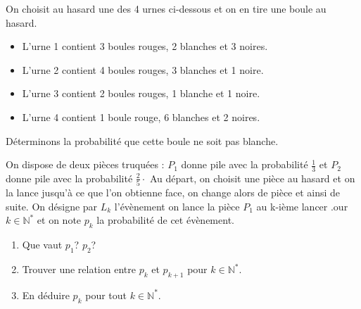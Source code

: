 \documentclass[french,11pt,twoside]{VcCours}
\begin{document}
\begin{Exemple} 
On choisit au hasard une des 4 urnes ci-dessous et on en tire une boule au hasard.
\begin{itemize}
 \item L'urne 1 contient 3 boules rouges, 2 blanches et 3 noires.
 \item L'urne 2 contient 4 boules rouges, 3 blanches et 1 noire.
 \item L'urne 3 contient 2 boules rouges, 1 blanche et 1 noire.
 \item L'urne 4 contient 1 boule rouge, 6 blanches et 2 noires.
\end{itemize}
Déterminons la probabilité que cette boule ne soit pas blanche.

\vspace{7cm}
\end{Exemple}

\begin{ApplicationDirecte}{} On dispose de deux pièces truquées : $P_1$ donne pile avec la probabilité $\frac{1}{3}$ et $P_2$ donne pile avec la probabilité $\frac{2}{5} \cdot$ Au départ, on choisit une pièce au hasard et on la lance jusqu'à ce que l'on obtienne face, on change alors de pièce et ainsi de suite. On désigne par $L_k$ l'évènement \og on lance la pièce $P_1$ au k-ième lancer \fg{}.our $k \in \mathbb{N}^*$ et on note $p_k$ la probabilité de cet évènement.
\begin{enumerate}
\item Que vaut $p_1$? $p_2$?
\item Trouver une relation entre $p_k$ et $p_{k+1}$ pour $k \in \mathbb{N}^*$.
\item En déduire $p_k$ pour tout $k \in \mathbb{N}^*$.
\end{enumerate}
\end{ApplicationDirecte}
\end{document}
